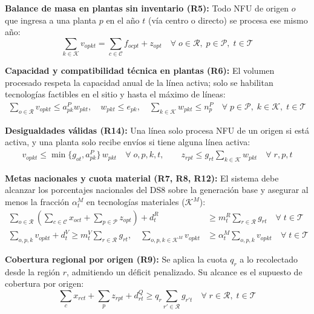 \documentclass[letterpaper]{article}
\begin{document}
\textbf{Balance de masa en plantas sin inventario (R5):} Todo NFU de origen $o$ que ingresa a una planta $p$ en el año $t$ (vía centro o directo) se procesa ese mismo año:
\begin{equation}
    \sum_{k \in \mathcal{K}} v_{opkt} = \sum_{c \in \mathcal{C}} f_{ocpt} + z_{opt} \quad \forall\; o \in \mathcal{R},\; p \in \mathcal{P},\; t \in \mathcal{T} \tag{R5}
\end{equation}

\textbf{Capacidad y compatibilidad técnica en plantas (R6):} El volumen procesado respeta la capacidad anual de la línea activa; solo se habilitan tecnologías factibles en el sitio y hasta el máximo de líneas:
\begin{align}
    \sum_{o \in \mathcal{R}} v_{opkt} \leq a^{P}_{pk} w_{pkt}, \quad w_{pkt} \leq e_{pk}, \quad \sum_{k \in \mathcal{K}} w_{pkt} \leq n^{P}_{p} \quad \forall\; p \in \mathcal{P},\; k \in \mathcal{K},\; t \in \mathcal{T} \tag{R6a--c}
\end{align}

\textbf{Desigualdades válidas (R14):} Una línea solo procesa NFU de un origen si está activa, y una planta solo recibe envíos si tiene alguna línea activa:
\begin{align}
    v_{opkt} \leq \min\{g_{ot}, a^{P}_{pk}\}\, w_{pkt} \quad \forall\; o,p,k,t, \qquad z_{rpt} \leq g_{rt} \sum_{k \in \mathcal{K}} w_{pkt} \quad \forall\; r,p,t \tag{R14a--b}
\end{align}

\textbf{Metas nacionales y cuota material (R7, R8, R12):} El sistema debe alcanzar los porcentajes nacionales del DS8 sobre la generación base y asegurar al menos la fracción $\alpha^{M}_{t}$ en tecnologías materiales ($\mathcal{K}^{M}$):
\begin{align}
    \sum_{o \in \mathcal{R}} \left( \sum_{c \in \mathcal{C}} x_{oct} + \sum_{p \in \mathcal{P}} z_{opt} \right) + d^{R}_{t} &\geq m^{R}_{t} \sum_{r \in \mathcal{R}} g_{rt} \quad \forall\; t \in \mathcal{T} \tag{R7} \\
    \sum_{o,p,k} v_{opkt} + d^{V}_{t} \geq m^{V}_{t} \sum_{r \in \mathcal{R}} g_{rt}, \quad \sum_{o,p, k \in \mathcal{K}^{M}} v_{opkt} &\geq \alpha^{M}_{t} \sum_{o,p,k} v_{opkt} \quad \forall\; t \in \mathcal{T} \tag{R8-R12}
\end{align}

\textbf{Cobertura regional por origen (R9):} Se aplica la cuota $q_{r}$ a lo recolectado desde la región $r$, admitiendo un déficit penalizado. Su alcance es el supuesto de cobertura por origen:
\begin{equation}
    \sum_{c} x_{rct} + \sum_{p} z_{rpt} + d^{Q}_{rt} \geq q_{r} \sum_{r' \in \mathcal{R}} g_{r't} \quad \forall\; r \in \mathcal{R},\; t \in \mathcal{T} \tag{R9}
\end{equation}
\end{document}
